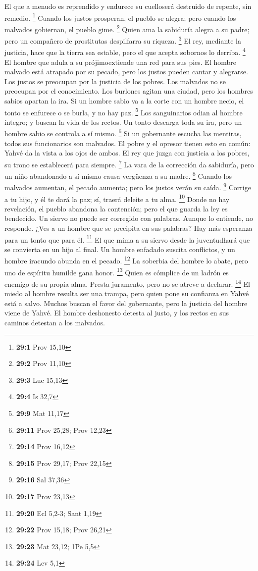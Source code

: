  El que a menudo es reprendido y endurece su cuelloserá
destruido de repente, sin remedio. \footnote{\textbf{29:1} Prov 15,10}
 Cuando los justos prosperan, el pueblo se alegra; pero
cuando los malvados gobiernan, el pueblo gime. \footnote{\textbf{29:2}
  Prov 11,10}  Quien ama la sabiduría alegra a su padre;
pero un compañero de prostitutas despilfarra su riqueza. \footnote{\textbf{29:3}
  Luc 15,13}  El rey, mediante la justicia, hace que la
tierra sea estable, pero el que acepta sobornos lo derriba. \footnote{\textbf{29:4}
  Is 32,7}  El hombre que adula a su prójimoextiende una
red para sus pies.  El hombre malvado está atrapado por su
pecado, pero los justos pueden cantar y alegrarse.  Los
justos se preocupan por la justicia de los pobres. Los malvados no se
preocupan por el conocimiento.  Los burlones agitan una
ciudad, pero los hombres sabios apartan la ira.  Si un
hombre sabio va a la corte con un hombre necio, el tonto se enfurece o
se burla, y no hay paz. \footnote{\textbf{29:9} Mat 11,17}
 Los sanguinarios odian al hombre íntegro; y buscan la
vida de los rectos.  Un tonto descarga toda su ira, pero
un hombre sabio se controla a sí mismo. \footnote{\textbf{29:11} Prov
  25,28; Prov 12,23}  Si un gobernante escucha las
mentiras, todos sus funcionarios son malvados.  El pobre
y el opresor tienen esto en común: Yahvé da la vista a los ojos de
ambos.  El rey que juzga con justicia a los pobres, su
trono se establecerá para siempre. \footnote{\textbf{29:14} Prov 16,12}
 La vara de la corrección da sabiduría, pero un niño
abandonado a sí mismo causa vergüenza a su madre. \footnote{\textbf{29:15}
  Prov 29,17; Prov 22,15}  Cuando los malvados aumentan,
el pecado aumenta; pero los justos verán su caída. \footnote{\textbf{29:16}
  Sal 37,36}  Corrige a tu hijo, y él te dará la paz; sí,
traerá deleite a tu alma. \footnote{\textbf{29:17} Prov 23,13}
 Donde no hay revelación, el pueblo abandona la
contención; pero el que guarda la ley es bendecido.  Un
siervo no puede ser corregido con palabras. Aunque lo entiende, no
responde.  ¿Ves a un hombre que se precipita en sus
palabras? Hay más esperanza para un tonto que para él. \footnote{\textbf{29:20}
  Ecl 5,2-3; Sant 1,19}  El que mima a su siervo desde la
juventudhará que se convierta en un hijo al final.  Un
hombre enfadado suscita conflictos, y un hombre iracundo abunda en el
pecado. \footnote{\textbf{29:22} Prov 15,18; Prov 26,21} 
La soberbia del hombre lo abate, pero uno de espíritu humilde gana
honor. \footnote{\textbf{29:23} Mat 23,12; 1Pe 5,5} 
Quien es cómplice de un ladrón es enemigo de su propia alma. Presta
juramento, pero no se atreve a declarar. \footnote{\textbf{29:24} Lev
  5,1}  El miedo al hombre resulta ser una trampa, pero
quien pone su confianza en Yahvé está a salvo.  Muchos
buscan el favor del gobernante, pero la justicia del hombre viene de
Yahvé.  El hombre deshonesto detesta al justo, y los
rectos en sus caminos detestan a los malvados.

